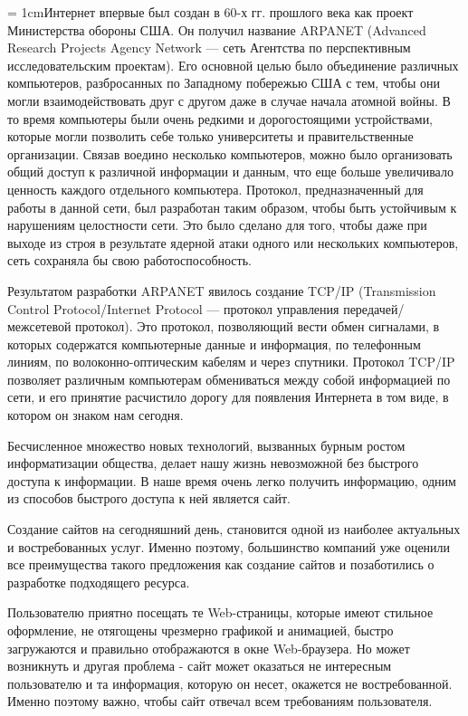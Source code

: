 \documentclass[14pt,a4paper]{extreport}
\begin{document}
	\parindent = 1cmИнтернет впервые был создан в 60-х гг. прошлого века как проект Министерства обороны США. Он получил название ARPANET (Advanced Research Projects Agency Network — сеть Агентства по перспективным исследовательским проектам). Его основной целью было объединение различных компьютеров, разбросанных по Западному побережью США с тем, чтобы они могли взаимодействовать друг с другом даже в случае начала атомной войны. В то время компьютеры были очень редкими и дорогостоящими устройствами, которые могли позволить себе только университеты и правительственные организации. Связав воедино несколько компьютеров, можно было организовать общий доступ к различной информации и данным, что еще больше увеличивало ценность каждого отдельного компьютера. Протокол, предназначенный для работы в данной сети, был разработан таким образом, чтобы быть устойчивым к нарушениям целостности сети. Это было сделано для того, чтобы даже при выходе из строя в результате ядерной атаки одного или нескольких компьютеров, сеть сохраняла бы свою работоспособность.\par 				Результатом разработки ARPANET явилось создание TCP/IP (Transmission Control Protocol/Internet Protocol — протокол управления передачей/межсетевой протокол). Это протокол, позволяющий вести обмен сигналами, в которых содержатся компьютерные данные и информация, по телефонным линиям, по волоконно-оптическим кабелям и через спутники. Протокол TCP/IP позволяет различным компьютерам обмениваться между собой информацией по сети, и его принятие расчистило дорогу для появления Интернета в том виде, в котором он знаком нам сегодня.\par
	Бесчисленное множество новых технологий, вызванных бурным ростом информатизации общества, делает нашу жизнь невозможной без быстрого доступа к информации. В наше время очень легко получить информацию, одним из способов быстрого доступа к ней является сайт.\par
	Создание сайтов на сегодняшний день, становится одной из наиболее актуальных и востребованных услуг. Именно поэтому, большинство компаний уже оценили все преимущества такого предложения как создание сайтов и позаботились о разработке подходящего ресурса.\par
	Пользователю приятно посещать те Web-страницы, которые имеют стильное оформление, не отягощены чрезмерно графикой и анимацией, быстро загружаются и правильно отображаются в окне Web-браузера. Но может возникнуть и другая проблема - сайт может оказаться не интересным пользователю и та информация, которую он несет, окажется не востребованной. Именно поэтому важно, чтобы сайт отвечал всем требованиям пользователя.\par
\end{document}
